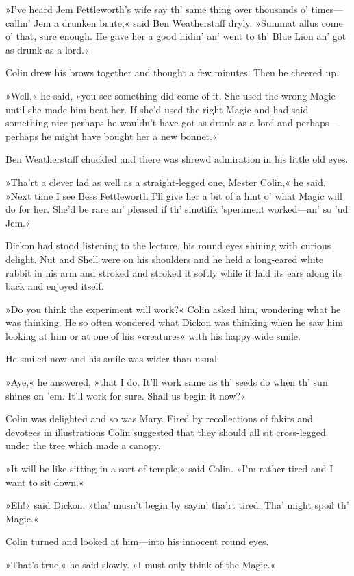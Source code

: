 »I've heard Jem Fettleworth's wife say th' same thing over thousands o' times—callin' Jem a drunken brute,« said Ben Weatherstaff dryly. »Summat allus come o' that, sure enough. He gave her a good hidin' an' went to th' Blue Lion an' got as drunk as a lord.«

Colin drew his brows together and thought a few minutes. Then he cheered up.

»Well,« he said, »you see something did come of it. She used the wrong Magic until she made him beat her. If she'd used the right Magic and had said something nice perhaps he wouldn't have got as drunk as a lord and perhaps—perhaps he might have bought her a new bonnet.«

Ben Weatherstaff chuckled and there was shrewd admiration in his little old eyes.

»Tha'rt a clever lad as well as a straight-legged one, Mester Colin,« he said. »Next time I see Bess Fettleworth I'll give her a bit of a hint o' what Magic will do for her. She'd be rare an' pleased if th' sinetifik 'speriment worked—an' so 'ud Jem.«

Dickon had stood listening to the lecture, his round eyes shining with curious delight. Nut and Shell were on his shoulders and he held a long-eared white rabbit in his arm and stroked and stroked it softly while it laid its ears along its back and enjoyed itself.

»Do you think the experiment will work?« Colin asked him, wondering what he was thinking. He so often wondered what Dickon was thinking when he saw him looking at him or at one of his »creatures« with his happy wide smile.

He smiled now and his smile was wider than usual.

»Aye,« he answered, »that I do. It'll work same as th' seeds do when th' sun shines on 'em. It'll work for sure. Shall us begin it now?«

Colin was delighted and so was Mary. Fired by recollections of fakirs and devotees in illustrations Colin suggested that they should all sit cross-legged under the tree which made a canopy.

»It will be like sitting in a sort of temple,« said Colin. »I'm rather tired and I want to sit down.«

»Eh!« said Dickon, »tha' musn't begin by sayin' tha'rt tired. Tha' might spoil th' Magic.«

Colin turned and looked at him—into his innocent round eyes.

»That's true,« he said slowly. »I must only think of the Magic.«

